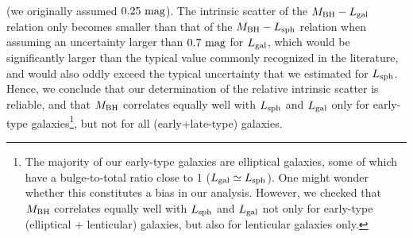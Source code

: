 \documentclass[preprint2]{emulateapj}
\begin{document}
(we originally assumed $0.25\rm~mag$).
The intrinsic scatter of the $M_{\rm BH} - L_{\rm gal}$ relation only becomes smaller than that of the $M_{\rm BH} - L_{\rm sph}$ relation 
when assuming an uncertainty larger than $0.7\rm~mag$ for $L_{\rm gal}$, 
which would be significantly larger than the typical value commonly recognized in the literature, 
and would also oddly exceed the typical uncertainty that we estimated for $L_{\rm sph}$. 
Hence, we conclude that our determination of the relative intrinsic scatter is reliable, 
and that $M_{\rm BH}$ correlates equally well with $L_{\rm sph}$ and $L_{\rm gal}$ only for early-type galaxies\footnote{The majority 
of our early-type galaxies are elliptical galaxies, some of which have a bulge-to-total ratio close to 1 ($L_{\rm gal} \simeq L_{\rm sph}$).
One might wonder whether this constitutes a bias in our analysis.
However, we checked that $M_{\rm BH}$ correlates equally well with $L_{\rm sph}$ and $L_{\rm gal}$ 
not only for early-type (elliptical + lenticular) galaxies, 
but also for lenticular galaxies only. }, 
but not for all (early+late-type) galaxies.
\end{document}
